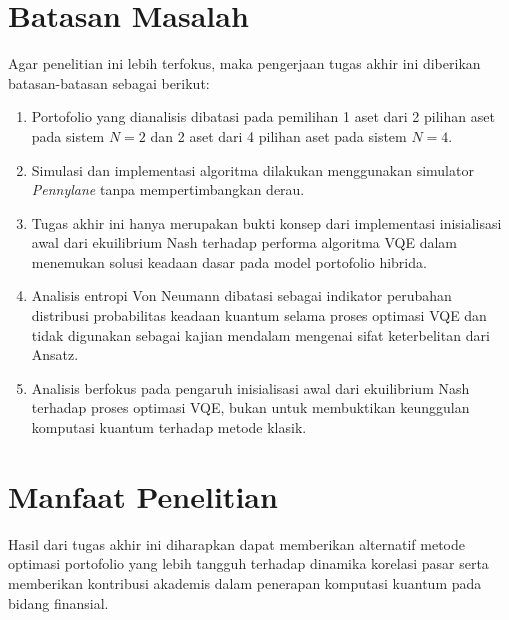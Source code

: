 \section{Batasan Masalah}
Agar penelitian ini lebih terfokus, maka pengerjaan tugas akhir ini diberikan batasan-batasan sebagai berikut:
\begin{enumerate}
    \item Portofolio yang dianalisis dibatasi pada pemilihan 1 aset dari 2 pilihan aset pada sistem $N=2$ dan 2 aset dari 4 pilihan aset pada sistem $N=4$.
    \item Simulasi dan implementasi algoritma dilakukan menggunakan simulator \textit{Pennylane} tanpa mempertimbangkan derau.
    \item Tugas akhir ini hanya merupakan bukti konsep dari implementasi inisialisasi awal dari ekuilibrium Nash terhadap performa algoritma VQE dalam menemukan solusi keadaan dasar pada model portofolio hibrida.
    \item Analisis entropi Von Neumann dibatasi sebagai indikator perubahan distribusi probabilitas keadaan kuantum selama proses optimasi VQE dan tidak digunakan sebagai kajian mendalam mengenai sifat keterbelitan dari Ansatz.
    \item Analisis berfokus pada pengaruh inisialisasi awal dari ekuilibrium Nash terhadap proses optimasi VQE, bukan untuk membuktikan keunggulan komputasi kuantum terhadap metode klasik.
\end{enumerate}

\section{Manfaat Penelitian}
Hasil dari tugas akhir ini diharapkan dapat memberikan alternatif metode optimasi portofolio yang lebih tangguh terhadap dinamika korelasi pasar serta memberikan kontribusi akademis dalam penerapan komputasi kuantum pada bidang finansial.
